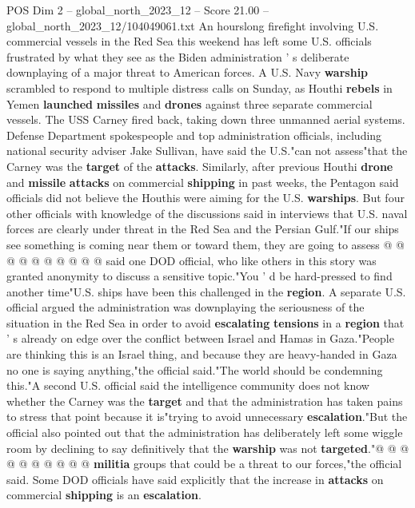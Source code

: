\begin{textsample}{POS Dim 2 – global\_north\_2023\_12 – Score 21.00 – global\_north\_2023\_12/104049061.txt}  \label{ex:f2_pos_239}
An hourslong firefight involving U.S. commercial vessels in the Red Sea this weekend has left some U.S. officials frustrated by what they see as the Biden administration ' s deliberate downplaying of a major threat to American forces.
A U.S.
Navy \textbf{warship} scrambled to respond to multiple distress calls on Sunday, as Houthi \textbf{rebels} in Yemen \textbf{launched} \textbf{missiles} and \textbf{drones} against three separate commercial vessels.
The USS Carney fired back, taking down three unmanned aerial systems.
Defense Department spokespeople and top administration officials, including national security adviser Jake Sullivan, have said the U.S."can not assess"that the Carney was the \textbf{target} of the \textbf{attacks}.
Similarly, after previous Houthi \textbf{drone} and \textbf{missile} \textbf{attacks} on commercial \textbf{shipping} in past weeks, the Pentagon said officials did not believe the Houthis were aiming for the U.S. \textbf{warships}.
But four other officials with knowledge of the discussions said in interviews that U.S. naval forces are clearly under threat in the Red Sea and the Persian Gulf."If our ships see something is coming near them or toward them, they are going to assess @ @ @ @ @ @ @ @ @ @ said one DOD official, who like others in this story was granted anonymity to discuss a sensitive topic."You ' d be hard-pressed to find another time"U.S. ships have been this challenged in the \textbf{region}.
A separate U.S. official argued the administration was downplaying the seriousness of the situation in the Red Sea in order to avoid \textbf{escalating} \textbf{tensions} in a \textbf{region} that ' s already on edge over the conflict between Israel and Hamas in Gaza."People are thinking this is an Israel thing, and because they are heavy-handed in Gaza no one is saying anything,"the official said."The world should be condemning this."A second U.S. official said the intelligence community does not know whether the Carney was the \textbf{target} and that the administration has taken pains to stress that point because it is"trying to avoid unnecessary \textbf{escalation}."But the official also pointed out that the administration has deliberately left some wiggle room by declining to say definitively that the \textbf{warship} was not \textbf{targeted}."@ @ @ @ @ @ @ @ @ @ \textbf{militia} groups that could be a threat to our forces,"the official said.
Some DOD officials have said explicitly that the increase in \textbf{attacks} on commercial \textbf{shipping} is an \textbf{escalation}.

\end{textsample}
